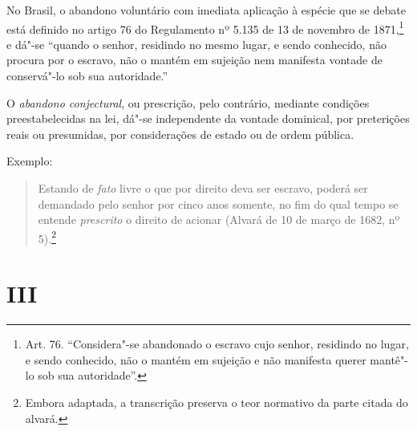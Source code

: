 No Brasil, o abandono voluntário com imediata aplicação à espécie que se
debate está definido no artigo 76 do Regulamento nº 5.135 de 13 de
novembro de 1871,\footnote{Art. 76. ``Considera"-se abandonado o escravo
  cujo senhor, residindo no lugar, e sendo conhecido, não o mantém em
  sujeição e não manifesta querer mantê"-lo sob sua autoridade''.} e dá"-se
``quando o senhor, residindo no mesmo lugar, e sendo conhecido, não
procura por o escravo, não o mantém em sujeição nem manifesta vontade de
conservá"-lo sob sua autoridade.''

O \emph{abandono conjectural}, ou prescrição, pelo contrário, mediante
condições preestabelecidas na lei, dá"-se independente da vontade
dominical, por preterições reais ou presumidas, por considerações de
estado ou de ordem pública.

Exemplo:

\begin{quote}
Estando de \emph{fato} livre o que por direito deva ser escravo, poderá
ser demandado pelo senhor por cinco anos somente, no fim do qual tempo
se entende \emph{prescrito} o direito de acionar (Alvará de 10 de março
de 1682, nº 5).\footnote{Embora adaptada, a transcrição preserva o
  teor normativo da parte citada do alvará.}
\end{quote}

\section*{III}

